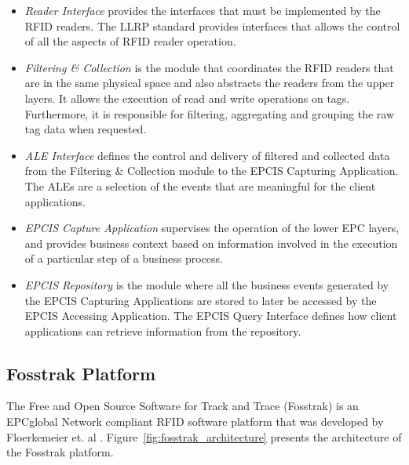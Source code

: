 \begin{itemize}
  \item \textit{Reader Interface} provides the interfaces that must be implemented by the \gls{RFID} readers.
  The \gls{LLRP} standard provides interfaces that allows the control of all the aspects of \gls{RFID}
  reader operation.
  \item \textit{Filtering \& Collection} is the module that coordinates the \gls{RFID} readers that are in the
  same physical space and also abstracts the readers from the upper layers. It allows the execution of
  read and write operations on tags. Furthermore, it is responsible for filtering, aggregating and
  grouping the raw tag data when requested.
  \item \textit{\gls{ALE} Interface} defines the control and delivery of filtered and collected data from the
  Filtering \&  Collection module to the \gls{EPCIS} Capturing Application. The \glspl{ALE} are a selection of
  the events that are meaningful for the client applications.
  \item \textit{EPCIS Capture Application} supervises the operation of the lower EPC layers, and provides
  business context based on information involved in the execution of a particular step of a business
  process.
  \item \textit{EPCIS Repository} is the module where all the business events generated by the
  EPCIS Capturing Applications are stored to later be accessed by the EPCIS Accessing Application.
  The EPCIS Query Interface defines how client applications can retrieve information from the repository.
\end{itemize}

\subsection{Fosstrak Platform}
\label{sub:fosstrak}
The Free and Open Source Software for Track and Trace (Fosstrak) is an EPCglobal Network compliant
\gls{RFID} software platform that was developed by Floerkemeier et. al \cite{floerkemeier2007rfid}.
Figure~\ref{fig:fosstrak_architecture} presents the architecture of the Fosstrak platform.

